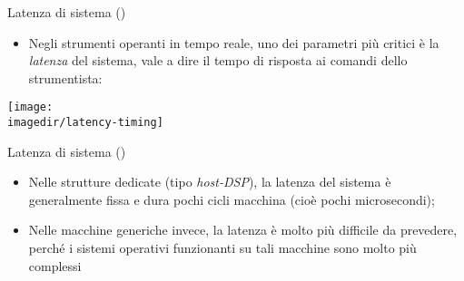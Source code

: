 %
%
%
%
%
\setcounter{ms}{1}
\begin{slide}{Latenza di sistema ()}
{

	\begin{itemize}

		\item Negli strumenti operanti in tempo reale,
              uno dei parametri pi\`u critici \`e la \emph{latenza}
              del sistema, vale a dire il tempo di risposta
              ai comandi dello strumentista:

	\end{itemize}

	\vspace{5mm}
	\begin{center}
		\texttt{[image: \\imagedir/latency-timing]}
	\end{center}

}
\end{slide}

\begin{slide}{Latenza di sistema ()}
{

	\begin{itemize}
	\setlength{\itemsep}{12mm}

		\item Nelle strutture dedicate (tipo \emph{host-DSP}),
              la latenza del sistema \`e generalmente
              fissa e dura pochi cicli macchina
              (cio\`e pochi microsecondi);

		\item Nelle macchine generiche invece,
              la latenza \`e molto pi\`u difficile da prevedere,
              perch\'e i sistemi operativi funzionanti
              su tali macchine sono molto pi\`u complessi

	\end{itemize}
}
\end{slide}
